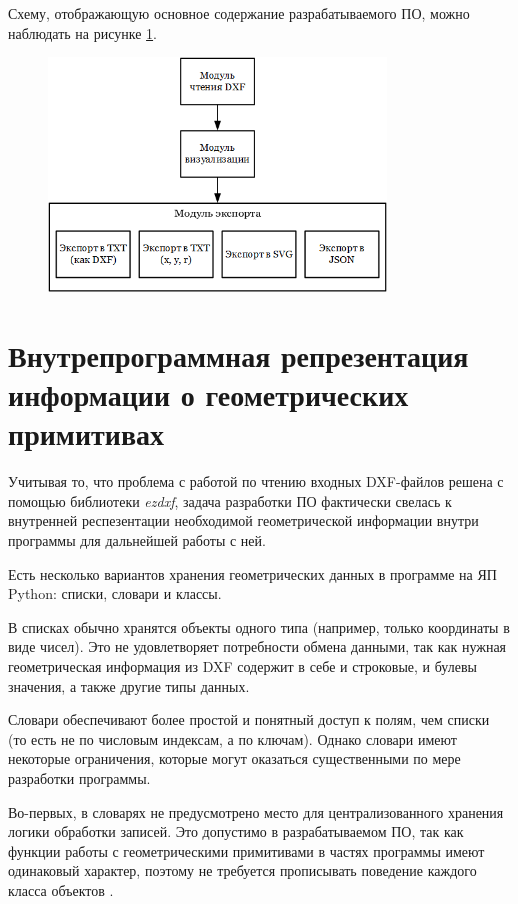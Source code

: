 Схему, отображающую основное содержание разрабатываемого ПО, можно наблюдать на рисунке \ref{fig:organisationsdiagramm}.

\begin{figure}[H]
	\centering
	\includegraphics[width=0.8\textwidth]{figures/organisationsdiagramm.png}
	\label{fig:organisationsdiagramm}
\end{figure}

\section{Внутрепрограммная репрезентация информации о геометрических примитивах}
Учитывая то, что проблема с работой по чтению входных DXF-файлов решена с помощью библиотеки \textit{ezdxf}, задача разработки ПО фактически свелась к внутренней респезентации необходимой геометрической информации внутри программы для дальнейшей работы с ней.

Есть несколько вариантов хранения геометрических данных в программе на ЯП Python: списки, словари и классы.

В списках обычно хранятся объекты одного типа (например, только координаты в виде чисел). Это не удовлетворяет потребности обмена данными, так как нужная геометрическая информация из DXF содержит в себе и строковые, и булевы значения, а также другие типы данных.

Словари обеспечивают более простой и понятный доступ к полям, чем списки (то есть не по числовым индексам, а по ключам). Однако словари имеют некоторые ограничения, которые могут оказаться существенными по мере разработки программы.

Во-первых, в словарях не предусмотрено место для централизованного хранения логики обработки записей. Это допустимо в разрабатываемом ПО, так как функции работы с геометрическими примитивами в частях программы имеют одинаковый характер, поэтому не требуется прописывать поведение каждого класса объектов \cite{lutz2001programming}.

